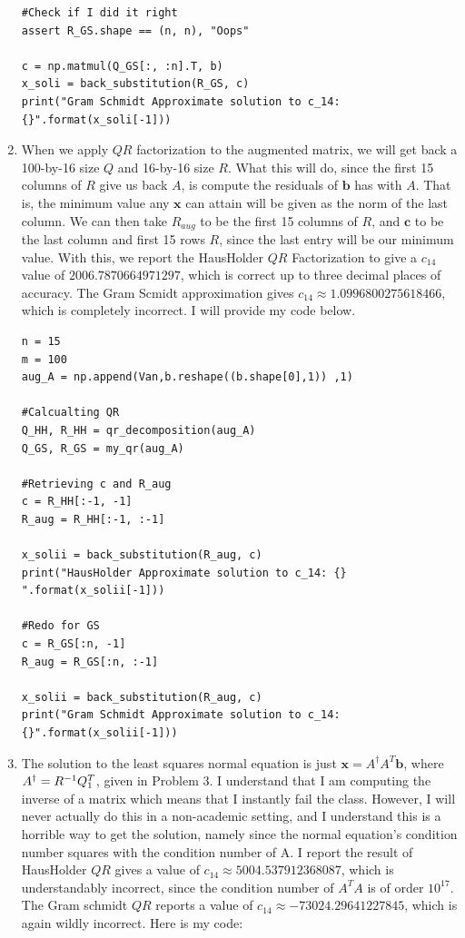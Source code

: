 \begin{solution}
\begin{enumerate}
\begin{lstlisting}
#Check if I did it right
assert R_GS.shape == (n, n), "Oops"

c = np.matmul(Q_GS[:, :n].T, b)
x_soli = back_substitution(R_GS, c)
print("Gram Schmidt Approximate solution to c_14: {}".format(x_soli[-1]))    
\end{lstlisting}

\item When we apply $QR$ factorization to the augmented matrix, we will get back a 100-by-16 size $Q$ and 16-by-16 size $R$. What this will do, since the first 15 columns of $R$ give us back $A$, is compute the residuals of $\textbf{b}$ has with $A$. That is, the minimum value any $\textbf{x}$ can attain will be given as the norm of the last column. We can then take $R_{aug}$ to be the first 15 columns of $R$, and $\textbf{c}$ to be the last column and first 15 rows $R$, since the last entry will be our minimum value. With this, we report the HausHolder $QR$ Factorization to give a $c_{14}$ value of $2006.7870664971297$, which is correct up to three decimal places of accuracy. The Gram Scmidt approximation gives $c_14 \approx 1.0996800275618466$, which is completely incorrect. I will provide my code below.

\begin{lstlisting}
n = 15
m = 100
aug_A = np.append(Van,b.reshape((b.shape[0],1)) ,1)

#Calcualting QR
Q_HH, R_HH = qr_decomposition(aug_A)
Q_GS, R_GS = my_qr(aug_A)

#Retrieving c and R_aug
c = R_HH[:-1, -1]
R_aug = R_HH[:-1, :-1]

x_solii = back_substitution(R_aug, c)
print("HausHolder Approximate solution to c_14: {} ".format(x_solii[-1]))

#Redo for GS
c = R_GS[:n, -1]
R_aug = R_GS[:n, :-1]

x_solii = back_substitution(R_aug, c)
print("Gram Schmidt Approximate solution to c_14: {}".format(x_solii[-1]))
\end{lstlisting}
\newpage
\item The solution to the least squares normal equation is just $\textbf{x} = A^\dag A^T\textbf{b}$, where $A^\dag = R^{-1} Q_1^T$, given in Problem 3. I understand that I am computing the inverse of a matrix which means that I instantly fail the class. However, I will never actually do this in a non-academic setting, and I understand this is a horrible way to get the solution, namely since the normal equation's condition number squares with the condition number of A. I report the result of HausHolder $QR$ gives a value of $c_{14} \approx 5004.537912368087$, which is understandably incorrect, since the condition number of $A^TA$ is of order $10^{17}.$ The Gram schmidt $QR$ reports a value of $c_{14} \approx -73024.29641227845$, which is again wildly incorrect. Here is my code:


\end{enumerate}
\end{solution}
